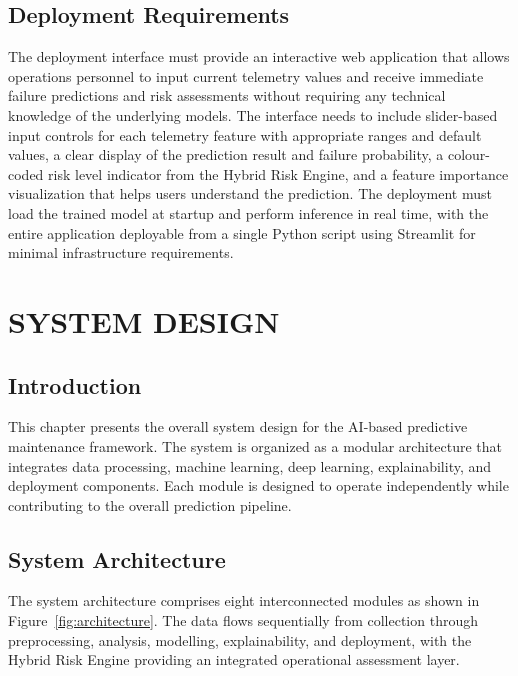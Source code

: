 \documentclass[12pt,letterpaper]{report}
\begin{document}
\section{Deployment Requirements}

The deployment interface must provide an interactive web application that allows operations personnel to input current telemetry values and receive immediate failure predictions and risk assessments without requiring any technical knowledge of the underlying models. The interface needs to include slider-based input controls for each telemetry feature with appropriate ranges and default values, a clear display of the prediction result and failure probability, a colour-coded risk level indicator from the Hybrid Risk Engine, and a feature importance visualization that helps users understand the prediction. The deployment must load the trained model at startup and perform inference in real time, with the entire application deployable from a single Python script using Streamlit for minimal infrastructure requirements.


\chapter{SYSTEM DESIGN}

\section{Introduction}

This chapter presents the overall system design for the AI-based predictive maintenance framework. The system is organized as a modular architecture that integrates data processing, machine learning, deep learning, explainability, and deployment components. Each module is designed to operate independently while contributing to the overall prediction pipeline.

\section{System Architecture}

The system architecture comprises eight interconnected modules as shown in Figure~\ref{fig:architecture}. The data flows sequentially from collection through preprocessing, analysis, modelling, explainability, and deployment, with the Hybrid Risk Engine providing an integrated operational assessment layer.
\end{document}
